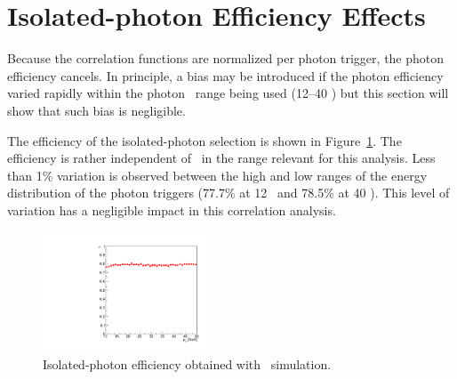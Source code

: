\label{sec:EfficiencyAppendix}
\section{Isolated-photon Efficiency Effects}

Because the correlation functions are normalized per photon trigger, the photon efficiency cancels. In principle, a bias may be introduced if the photon efficiency varied rapidly within the photon \pt~range being used (12--40 \GeVc) but this section will show that such bias is negligible.  

The efficiency of the isolated-photon selection is shown in Figure~\ref{fig:photonEff_pPb}. The efficiency is rather independent of \pt~in the range relevant for this analysis. Less than 1\% variation is observed between the high and low ranges of the energy distribution of the photon triggers (77.7\% at 12 \GeVc~and 78.5\% at 40 \GeVc). This level of variation has a negligible impact in this correlation analysis. 
\begin{figure}
\centering
\includegraphics[width=0.45\textwidth]{Checks_Systematics/Efficiency_photon_pPb}
\caption{Isolated-photon efficiency obtained with \pPb~simulation.}
\label{fig:photonEff_pPb}
\end{figure}



